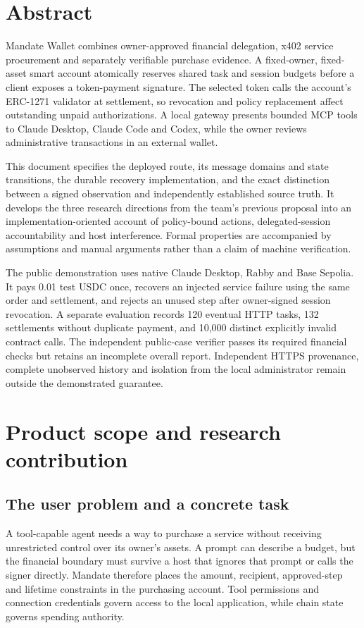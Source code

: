 \section*{Abstract}
Mandate Wallet combines owner-approved financial delegation, x402 service procurement and separately verifiable purchase evidence. A fixed-owner, fixed-asset smart account atomically reserves shared task and session budgets before a client exposes a token-payment signature. The selected token calls the account's ERC-1271 validator at settlement, so revocation and policy replacement affect outstanding unpaid authorizations. A local gateway presents bounded MCP tools to Claude Desktop, Claude Code and Codex, while the owner reviews administrative transactions in an external wallet.

This document specifies the deployed route, its message domains and state transitions, the durable recovery implementation, and the exact distinction between a signed observation and independently established source truth. It develops the three research directions from the team's previous proposal into an implementation-oriented account of policy-bound actions, delegated-session accountability and host interference. Formal properties are accompanied by assumptions and manual arguments rather than a claim of machine verification.

The public demonstration uses native Claude Desktop, Rabby and Base Sepolia. It pays 0.01 test USDC once, recovers an injected service failure using the same order and settlement, and rejects an unused step after owner-signed session revocation. A separate evaluation records 120 eventual HTTP tasks, 132 settlements without duplicate payment, and 10,000 distinct explicitly invalid contract calls. The independent public-case verifier passes its required financial checks but retains an incomplete overall report. Independent HTTPS provenance, complete unobserved history and isolation from the local administrator remain outside the demonstrated guarantee.\citep{case,eval,repro}

\section{Product scope and research contribution}\label{sec:introduction}
\subsection{The user problem and a concrete task}
A tool-capable agent needs a way to purchase a service without receiving unrestricted control over its owner's assets. A prompt can describe a budget, but the financial boundary must survive a host that ignores that prompt or calls the signer directly. Mandate therefore places the amount, recipient, approved-step and lifetime constraints in the purchasing account. Tool permissions and connection credentials govern access to the local application, while chain state governs spending authority.

